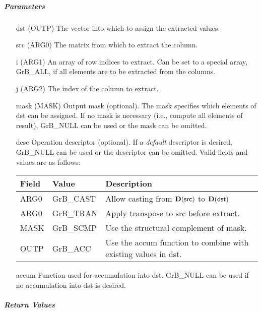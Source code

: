 \subparagraph{Parameters}

\begin{itemize}[leftmargin=1in]
    \item[{\sf dst}]   (OUTP) The vector into which to assign the extracted values.
    \item[{\sf src}]   (ARG0) The matrix from which to extract the column.

    \item[{\sf i}]     (ARG1) An array of row indices to extract. Can
                              be set to a special array, {\sf GrB\_ALL}, if all elements
                              are to be extracted from the columns.
    \item[{\sf j}]     (ARG2) The index of the column to extract.

    \item[{\sf mask}]  (MASK) Output mask (optional). The mask
    specifies which elements of {\sf dst} can be assigned.
    If no mask is necessary (i.e., compute all elements of result),
    {\sf GrB\_NULL} can be used or the mask can be omitted.

    \item[{\sf desc}]   Operation descriptor (optional). If a
    \emph{default} descriptor is desired, {\sf GrB\_NULL} can be
    used or the descriptor can be omitted.  Valid fields and values are as follows: \\
    \begin{tabular}{lll}
    Field  & Value & Description \\
    \hline
    {\sf ARG0} & {\sf GrB\_CAST} & Allow casting from $\bold{D}({\sf src})$ to $\bold{D}({\sf dst})$ \\
    {\sf ARG0} & {\sf GrB\_TRAN} & Apply transpose to {\sf src} before extract. \\
    {\sf MASK} & {\sf GrB\_SCMP} & Use the structural complement of {\sf mask}. \\
    {\sf OUTP} & {\sf GrB\_ACC}  & Use the {\sf accum} function to combine with existing values in {\sf dst}.\\
    \end{tabular}

    \item[{\sf accum}] Function used for accumulation into dst.  {\sf GrB\_NULL}
                       can be used if no accumulation into dst is desired.
\end{itemize}

\subparagraph{Return Values}

